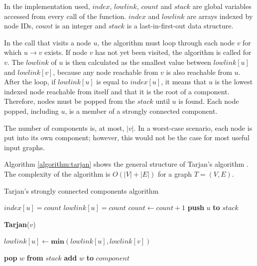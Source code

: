 In the implementation used, $index$, $lowlink$, $count$ and $stack$ are global variables accessed from every call of the function.
$index$ and $lowlink$ are arrays indexed by node IDs, $count$ is an integer and $stack$ is a last-in-first-out data structure.

In the call that visits a node $u$, the algorithm must loop through each node $v$ for which $u \rightarrow v$ exists.
If node $v$ has not yet been visited, the algorithm is called for  $v$.
The $lowlink$ of $u$ is then calculated as the smallest value between $lowlink[u]$ and $lowlink[v]$, because any node reachable from $v$ is also reachable from $u$.
After the loop, if $lowlink[u]$ is equal to $index[u]$, it means that $u$ is the lowest indexed node reachable from itself and that it is the root of a component.
Therefore, nodes must be popped from the $stack$ until $u$ is found.
Each node popped, including $u$, is a member of a strongly connected component.

The number of components is, at most, $|v|$.
In a worst-case scenario, each node is put into its own component; however, this would not be the case for most useful input graphs.

Algorithm \autoref{algorithm:tarjan} shows the general structure of Tarjan's algorithm  \cite{tarjan1972depth} \cite{vernize2013dissertation}.
The complexity of the algorithm is $O(|V|+|E|)$ for a graph $T = (V,E)$.

\begin{algorithm}
\caption{Tarjan's strongly connected components algorithm}\label{algorithm:tarjan}
\begin{algorithmic}[1]


\State $index[u] = count$
\State $lowlink[u] = count$
\State $count \gets count + 1$
\State \textbf{push} $u$ \textbf{to} $stack$

	
		\State \textbf{Tarjan}($v$)
	\EndIf
	
	\State $lowlink[u] \gets \textbf{min}(lowlink[u],lowlink[v])$
\EndFor

	\Repeat
		\State \textbf{pop} $w$ \textbf{from} $stack$
		\State \textbf{add} $w$ \textbf{to} $component$
\EndIf

\EndFunction
\end{algorithmic}
\end{algorithm}


